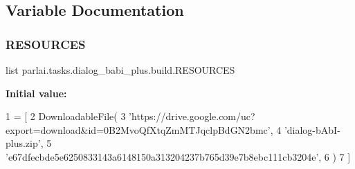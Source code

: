 \subsection{Variable Documentation}
\mbox{\label{namespaceparlai_1_1tasks_1_1dialog__babi__plus_1_1build_a1bb4d3fa841149fd8c1d8c16c67cc1da}} 
\subsubsection{\texorpdfstring{R\+E\+S\+O\+U\+R\+C\+ES}{RESOURCES}}
{\footnotesize\ttfamily list parlai.\+tasks.\+dialog\+\_\+babi\+\_\+plus.\+build.\+R\+E\+S\+O\+U\+R\+C\+ES}

{\bfseries Initial value\+:}
\begin{DoxyCode}
1 =  [
2     DownloadableFile(
3         \textcolor{stringliteral}{'https://drive.google.com/uc?export=download&id=0B2MvoQfXtqZmMTJqclpBdGN2bmc'},
4         \textcolor{stringliteral}{'dialog-bAbI-plus.zip'},
5         \textcolor{stringliteral}{'e67dfecbde5e6250833143a6148150a313204237b765d39e7b8ebc111cb3204e'},
6     )
7 ]
\end{DoxyCode}
